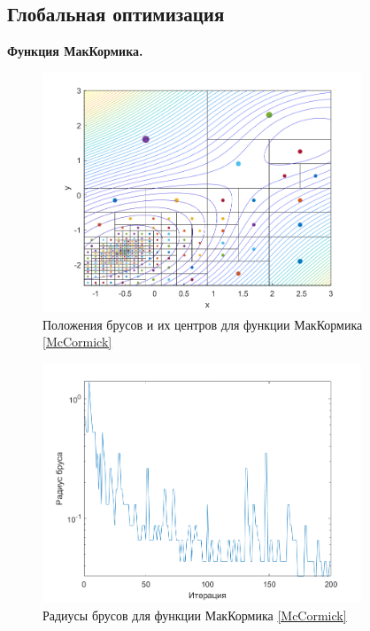 \subsection{Глобальная оптимизация}
\textbf{Функция МакКормика.}\\
\begin{figure}[H]
\centering
\includegraphics[width=0.85\textwidth]{Graphics/McCormick_algo.png}
\caption{Положения брусов и их центров для функции МакКормика \eqref{McCormick}} 
\end{figure}
\begin{figure}[H]
\centering
\includegraphics[width=0.85\textwidth]{Graphics/McCormick_bar_rad.png}
\caption{Радиусы брусов для функции МакКормика \eqref{McCormick}} 
\end{figure}

